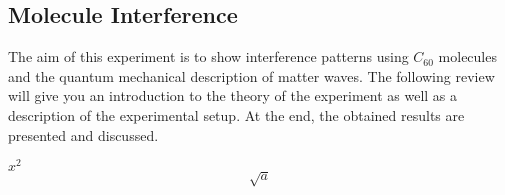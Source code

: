\documentclass[12pt,a4paper]{article}
\begin{document}

\pagebreak

\setlength{\columnsep}{20pt}
\begin{multicols}{2}

\begin{abstract}

\end{abstract}


%

\section{Molecule Interference}
The aim of this experiment is to show interference patterns using $C_60$ molecules and the quantum mechanical description of matter waves. The following review will give you an introduction to the theory of the experiment as well as a description of the experimental setup. At the end, the obtained results are presented and discussed.

$x^2$\\

$$\sqrt{a}$$


\end{multicols}
\end{document}
